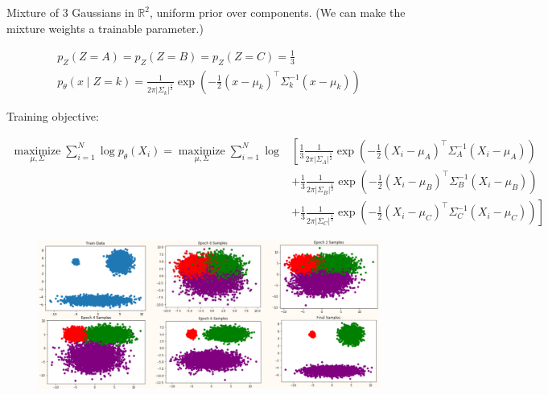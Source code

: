 \documentclass{report}
\begin{document}
\begin{example}
    Mixture of 3 Gaussians in $\mathbb{R}^{2}$, uniform prior over components. (We can make the mixture weights a trainable parameter.)

    $$
    \begin{gathered}
    p_{Z}(Z=A)=p_{Z}(Z=B)=p_{Z}(Z=C)=\frac{1}{3} \\
    p_{\theta}(x \mid Z=k)=\frac{1}{2 \pi\left|\Sigma_{k}\right|^{\frac{1}{2}}} \exp \left(-\frac{1}{2}\left(x-\mu_{k}\right)^{\top} \Sigma_{k}^{-1}\left(x-\mu_{k}\right)\right)
    \end{gathered}
    $$

    Training objective:

    $$
    \begin{aligned}
    \underset{\mu, \Sigma}{\operatorname{maximize}} \sum_{i=1}^{N} \log p_{\theta}\left(X_{i}\right)=\underset{\mu, \Sigma}{\operatorname{maximize}} \sum_{i=1}^{N} \log & \left[ \frac{1}{3} \frac{1}{2 \pi\left|\Sigma_{A}\right|^{\frac{1}{2}}} \exp \left(-\frac{1}{2}\left(X_{i}-\mu_{A}\right)^{\top} \Sigma_{A}^{-1}\left(X_{i}-\mu_{A}\right)\right) \right.\\
    & +\frac{1}{3} \frac{1}{2 \pi\left|\Sigma_{B}\right|^{\frac{1}{2}}} \exp \left(-\frac{1}{2}\left(X_{i}-\mu_{B}\right)^{\top} \Sigma_{B}^{-1}\left(X_{i}-\mu_{B}\right)\right) \\
    & \left.+\frac{1}{3} \frac{1}{2 \pi\left|\Sigma_{C}\right|^{\frac{1}{2}}} \exp \left(-\frac{1}{2}\left(X_{i}-\mu_{C}\right)^{\top} \Sigma_{C}^{-1}\left(X_{i}-\mu_{C}\right)\right)\right]
    \end{aligned}
    $$

    \begin{figure}[H]
        \centering
        \includegraphics[width=1.0\textwidth]{.././assets/11.3.png}
    \end{figure}
\end{example}
\end{document}
